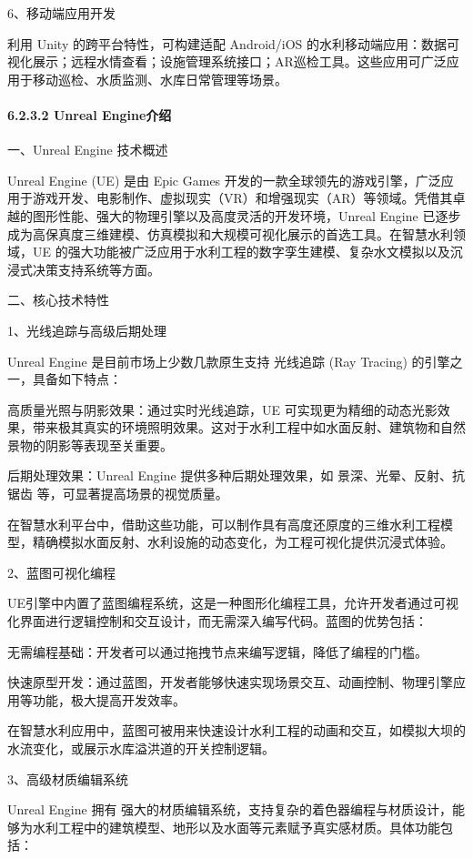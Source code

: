 6、移动端应用开发

利用 Unity 的跨平台特性，可构建适配 Android/iOS 的水利移动端应用：数据可视化展示；远程水情查看；设施管理系统接口；AR巡检工具。这些应用可广泛应用于移动巡检、水质监测、水库日常管理等场景。

\hypertarget{unreal-engineux4ecbux7ecd}{%
\paragraph{6.2.3.2 Unreal Engine介绍}\label{unreal-engineux4ecbux7ecd}}

一、Unreal Engine 技术概述

Unreal Engine (UE) 是由 Epic Games 开发的一款全球领先的游戏引擎，广泛应用于游戏开发、电影制作、虚拟现实（VR）和增强现实（AR）等领域。凭借其卓越的图形性能、强大的物理引擎以及高度灵活的开发环境，Unreal Engine 已逐步成为高保真度三维建模、仿真模拟和大规模可视化展示的首选工具。在智慧水利领域，UE 的强大功能被广泛应用于水利工程的数字孪生建模、复杂水文模拟以及沉浸式决策支持系统等方面。

二、核心技术特性

1、光线追踪与高级后期处理

Unreal Engine 是目前市场上少数几款原生支持 光线追踪 (Ray Tracing) 的引擎之一，具备如下特点：

高质量光照与阴影效果：通过实时光线追踪，UE 可实现更为精细的动态光影效果，带来极其真实的环境照明效果。这对于水利工程中如水面反射、建筑物和自然景物的阴影等表现至关重要。

后期处理效果：Unreal Engine 提供多种后期处理效果，如 景深、光晕、反射、抗锯齿 等，可显著提高场景的视觉质量。

在智慧水利平台中，借助这些功能，可以制作具有高度还原度的三维水利工程模型，精确模拟水面反射、水利设施的动态变化，为工程可视化提供沉浸式体验。

2、蓝图可视化编程

UE引擎中内置了蓝图编程系统，这是一种图形化编程工具，允许开发者通过可视化界面进行逻辑控制和交互设计，而无需深入编写代码。蓝图的优势包括：

无需编程基础：开发者可以通过拖拽节点来编写逻辑，降低了编程的门槛。

快速原型开发：通过蓝图，开发者能够快速实现场景交互、动画控制、物理引擎应用等功能，极大提高开发效率。

在智慧水利应用中，蓝图可被用来快速设计水利工程的动画和交互，如模拟大坝的水流变化，或展示水库溢洪道的开关控制逻辑。

3、高级材质编辑系统

Unreal Engine 拥有 强大的材质编辑系统，支持复杂的着色器编程与材质设计，能够为水利工程中的建筑模型、地形以及水面等元素赋予真实感材质。具体功能包括：

